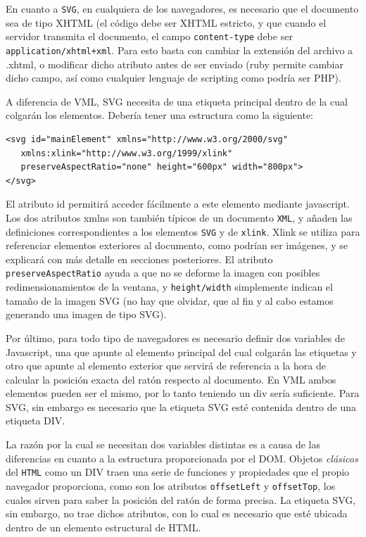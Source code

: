 En cuanto a \texttt{SVG}, en cualquiera de los navegadores, es necesario que el documento sea de tipo XHTML (el código debe ser XHTML estricto, y que cuando el servidor transmita el documento, el campo \texttt{content-type} debe ser \texttt{application/xhtml+xml}. Para esto basta con cambiar la extensión del archivo a .xhtml, o modificar dicho atributo antes de ser enviado (ruby permite cambiar dicho campo, así como cualquier lenguaje de scripting como podría ser PHP). 

A diferencia de VML, SVG necesita de una etiqueta principal dentro de la cual colgarán los elementos. Debería tener una estructura como la siguiente:

\begin{verbatim}
<svg id="mainElement" xmlns="http://www.w3.org/2000/svg" 
   xmlns:xlink="http://www.w3.org/1999/xlink" 
   preserveAspectRatio="none" height="600px" width="800px">
</svg>
\end{verbatim}

El atributo id permitirá acceder fácilmente a este elemento mediante javascript. Los dos atributos xmlns son también típicos de un documento \texttt{XML}, y añaden las definiciones correspondientes a los elementos \texttt{SVG} y de \texttt{xlink}. Xlink se utiliza para referenciar elementos exteriores al documento, como podrían ser imágenes, y se explicará con más detalle en secciones posteriores. El atributo \texttt{preserveAspectRatio} ayuda a que no se deforme la imagen con posibles redimensionamientos de la ventana, y \texttt{height/width} simplemente indican el tamaño de la imagen SVG (no hay que olvidar, que al fin y al cabo estamos generando una imagen de tipo SVG).

Por último, para todo tipo de navegadores es necesario definir dos variables de Javascript, una que apunte al elemento principal del cual colgarán las etiquetas y otro que apunte al elemento exterior que servirá de referencia a la hora de calcular la posición exacta del ratón respecto al documento. En VML ambos elementos pueden ser el mismo, por lo tanto teniendo un div sería suficiente. Para SVG, sin embargo es necesario que la etiqueta SVG esté contenida dentro de una etiqueta DIV.

La razón por la cual se necesitan dos variables distintas es a causa de las diferencias en cuanto a la estructura proporcionada por el DOM. Objetos \emph{clásicos} del \texttt{HTML} como un DIV traen una serie de funciones y propiedades que el propio navegador proporciona, como son los atributos \texttt{offsetLeft} y \texttt{offsetTop}, los cuales sirven para saber la posición del ratón de forma precisa. La etiqueta SVG, sin embargo, no trae dichos atributos, con lo cual es necesario que esté ubicada dentro de un elemento estructural de HTML.


